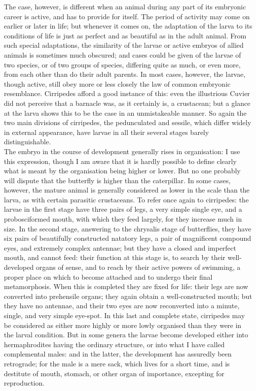 \indent The case, however, is different when an animal during any part of its embryonic career is active, and has to provide for itself. The period of activity may come on earlier or later in life; but whenever it comes on, the adaptation of the larva to its conditions of life is just as perfect and as beautiful as in the adult animal. From such special adaptations, the similarity of the larvae or active embryos of allied animals is sometimes much obscured; and cases could be given of the larvae of two species, or of two groups of species, differing quite as much, or even more, from each other than do their adult parents. In most cases, however, the larvae, though active, still obey more or less closely the law of common embryonic resemblance. Cirripedes afford a good instance of this: even the illustrious Cuvier did not perceive that a barnacle was, as it certainly is, a crustacean; but a glance at the larva shows this to be the case in an unmistakeable manner. So again the two main divisions of cirripedes, the pedunculated and sessile, which differ widely in external appearance, have larvae in all their several stages barely distinguishable.~\\
\indent The embryo in the course of development generally rises in organisation: I use this expression, though I am aware that it is hardly possible to define clearly what is meant by the organisation being higher or lower. But no one probably will dispute that the butterfly is higher than the caterpillar. In some cases, however, the mature animal is generally considered as lower in the scale than the larva, as with certain parasitic crustaceans. To refer once again to cirripedes: the larvae in the first stage have three pairs of legs, a very simple single eye, and a probosciformed mouth, with which they feed largely, for they increase much in size. In the second stage, answering to the chrysalis stage of butterflies, they have six pairs of beautifully constructed natatory legs, a pair of magnificent compound eyes, and extremely complex antennae; but they have a closed and imperfect mouth, and cannot feed: their function at this stage is, to search by their well-developed organs of sense, and to reach by their active powers of swimming, a proper place on which to become attached and to undergo their final metamorphosis. When this is completed they are fixed for life: their legs are now converted into prehensile organs; they again obtain a well-constructed mouth; but they have no antennae, and their two eyes are now reconverted into a minute, single, and very simple eye-spot. In this last and complete state, cirripedes may be considered as either more highly or more lowly organised than they were in the larval condition. But in some genera the larvae become developed either into hermaphrodites having the ordinary structure, or into what I have called complemental males: and in the latter, the development has assuredly been retrograde; for the male is a mere sack, which lives for a short time, and is destitute of mouth, stomach, or other organ of importance, excepting for reproduction.~\\
